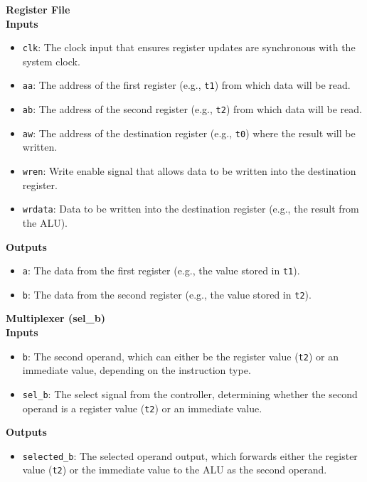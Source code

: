 \begin{minipage}[t]{0.3\textwidth}
    \footnotesize
    \textbf{Register File} \\ \vspace*{5px}
    \textbf{Inputs}
    \begin{itemize}
        \item \texttt{clk}: The clock input that ensures register updates are synchronous with the system clock.
        \item \texttt{aa}: The address of the first register (e.g., \texttt{t1}) from which data will be read.
        \item \texttt{ab}: The address of the second register (e.g., \texttt{t2}) from which data will be read.
        \item \texttt{aw}: The address of the destination register (e.g., \texttt{t0}) where the result will be written.
        \item \texttt{wren}: Write enable signal that allows data to be written into the destination register.
        \item \texttt{wrdata}: Data to be written into the destination register (e.g., the result from the ALU).
    \end{itemize}
    \textbf{Outputs}
    \begin{itemize}
        \item \texttt{a}: The data from the first register (e.g., the value stored in \texttt{t1}).
        \item \texttt{b}: The data from the second register (e.g., the value stored in \texttt{t2}).
    \end{itemize}
\end{minipage}
\hfill
\vline
\hfill
\begin{minipage}[t]{0.3\textwidth}
    \footnotesize
    \textbf{Multiplexer (sel\_b)} \\ \vspace*{5px}
    \textbf{Inputs}
    \begin{itemize}
        \item \texttt{b}: The second operand, which can either be the register value (\texttt{t2}) or an immediate value, depending on the instruction type.
        \item \texttt{sel\_b}: The select signal from the controller, determining whether the second operand is a register value (\texttt{t2}) or an immediate value.
    \end{itemize}
    \textbf{Outputs}
    \begin{itemize}
        \item \texttt{selected\_b}: The selected operand output, which forwards either the register value (\texttt{t2}) or the immediate value to the ALU as the second operand.
    \end{itemize}
\end{minipage}
